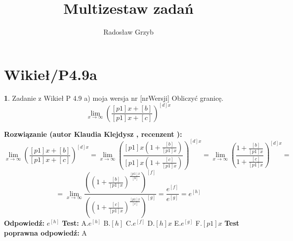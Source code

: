 \documentclass[12pt, a4paper]{article}
\title{Multizestaw zadań}
\author{Radosław Grzyb}
\date{}
\theoremstyle{definition} %
\newtheorem{zad}{}
\newcommand{\kategoria}[1]{\section{#1}} %
\newcommand{\zadStart}[1]{\begin{zad}#1\newline} %
\newcommand{\zadStop}{\end{zad}}   %
\newcommand{\rozwStart}[2]{\noindent \textbf{Rozwiązanie (autor #1 , recenzent #2): }\newline} %
\newcommand{\rozwStop}{\newline}                                            %
\newcommand{\odpStart}{\noindent \textbf{Odpowiedź:}\newline}    %
\newcommand{\odpStop}{\newline}                                             %
\newcommand{\testStart}{\noindent \textbf{Test:}\newline} %
\newcommand{\testStop}{\newline} %
\newcommand{\kluczStart}{\noindent \textbf{Test poprawna odpowiedź:}\newline} %
\newcommand{\kluczStop}{\newline} %
\begin{document}
\maketitle


\kategoria{Wikieł/P4.9a}
\zadStart{Zadanie z Wikieł P 4.9 a) moja wersja nr [nrWersji]}
Obliczyć granicę.
$$\lim_{x\to\infty}\left(\frac{[p1]x+[b]}{[p1]x+[c]}\right)^{[d]x}$$
\zadStop
\rozwStart{Klaudia Klejdysz}{}
$$\lim_{x\to\infty}\left(\frac{[p1]x+[b]}{[p1]x+[c]}\right)^{[d]x}=\lim_{x\to\infty}\left(\frac{[p1]x(1+\frac{[b]}{[p1]x})}{[p1]x(1+\frac{[c]}{[p1]x})}\right)^{[d]x}=\lim_{x\to\infty}\left(\frac{1+\frac{[b]}{[p1]x}}{1+\frac{[c]}{[p1]x}}\right)^{[d]x}=$$
$$=\lim_{x\to\infty}\frac{((1+\frac{[b]}{[p1]x})^{\frac{[p1]x}{[b]}})^{[f]}}{((1+\frac{[c]}{[p1]x})^{\frac{[p1]x}{[c]}})^{[g]}}=\frac{e^{[f]}}{e^{[g]}}=e^{[h]}$$
\rozwStop
\odpStart
$e^{[h]}$
\odpStop
\testStart
A.$e^{[h]}$
B.$[h]$
C.$e^{[f]}$
D.$[h]x$
E.$e^{[g]}$
F.$[p1]x$
\testStop
\kluczStart
A
\kluczStop
\end{document}
